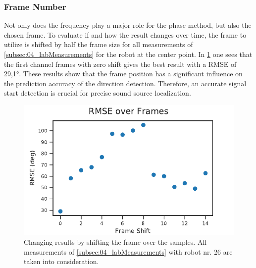 \subsubsection*{Frame Number}
\label{subsubsec:04_frameNumber}

Not only does the frequency play a major role for the phase method,
but also the chosen frame.
To evaluate if and how the result changes over time, the frame to
utilize is shifted by half the frame size for all measurements
of \cref{subsec:04_labMeasurements} for the robot at the center
point.
In \cref{fig:04_phaseOverTime} one sees that the first channel frames with zero
shift gives the best result with a \ac{RMSE} of 29,1\si{\degree}. These results
show that the frame position has a significant influence on the prediction
accuracy of the direction detection. Therefore, an accurate signal start
detection is crucial for precise sound source localization.
\begin{figure}[ht]
	\centering
		\includegraphics[]{figures/evaluation/phase_over_time}
	\caption{Changing results by shifting the frame over the
	samples. All measurements of \cref{subsec:04_labMeasurements}
	with robot nr. 26 are taken into consideration.}
	\label{fig:04_phaseOverTime}
\end{figure}

